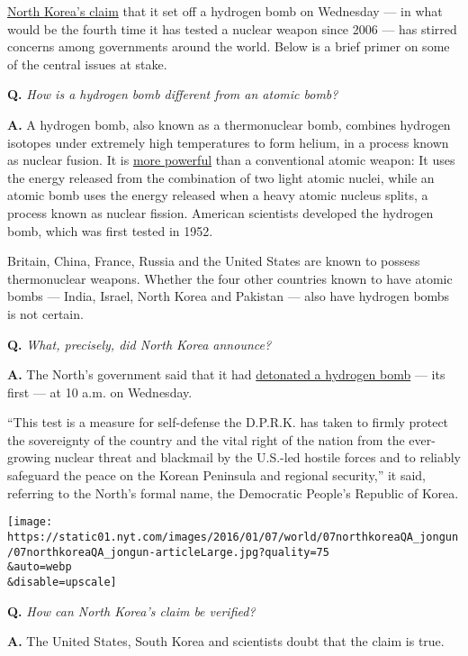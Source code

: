 \href{http://www.nytimes.com/2016/01/07/world/asia/north-korea-hydrogen-bomb-claim-reactions.html}{North
Korea's claim} that it set off a hydrogen bomb on Wednesday --- in what
would be the fourth time it has tested a nuclear weapon since 2006 ---
has stirred concerns among governments around the world. Below is a
brief primer on some of the central issues at stake.

\textbf{Q.} \emph{How is a hydrogen bomb different from an atomic bomb?}

\textbf{A.} A hydrogen bomb, also known as a thermonuclear bomb,
combines hydrogen isotopes under extremely high temperatures to form
helium, in a process known as nuclear fusion. It is
\href{http://www.ucsusa.org/nuclear-weapons/us-nuclear-weapons-policy/how-nuclear-weapons-work\#.Vo0mr5OLRQN}{more
powerful} than a conventional atomic weapon: It uses the energy released
from the combination of two light atomic nuclei, while an atomic bomb
uses the energy released when a heavy atomic nucleus splits, a process
known as nuclear fission. American scientists developed the hydrogen
bomb, which was first tested in 1952.

Britain, China, France, Russia and the United States are known to
possess thermonuclear weapons. Whether the four other countries known to
have atomic bombs --- India, Israel, North Korea and Pakistan --- also
have hydrogen bombs is not certain.

\textbf{Q.} \emph{What, precisely, did North Korea announce?}

\textbf{A.} The North's government said that it had
\href{http://www.nytimes.com/2016/01/06/world/asia/north-korea-hydrogen-bomb-test.html}{detonated
a hydrogen bomb} --- its first --- at 10 a.m. on Wednesday.

``This test is a measure for self-defense the D.P.R.K. has taken to
firmly protect the sovereignty of the country and the vital right of the
nation from the ever-growing nuclear threat and blackmail by the
U.S.-led hostile forces and to reliably safeguard the peace on the
Korean Peninsula and regional security,'' it said, referring to the
North's formal name, the Democratic People's Republic of Korea.

\texttt{[image: https://static01.nyt.com/images/2016/01/07/world/07northkoreaQA\_jongun/07northkoreaQA\_jongun-articleLarge.jpg?quality=75\\\&auto=webp\\\&disable=upscale]}

\textbf{Q.} \emph{How can North Korea's claim be verified?}

\textbf{A.} The United States, South Korea and scientists doubt that the
claim is true.


